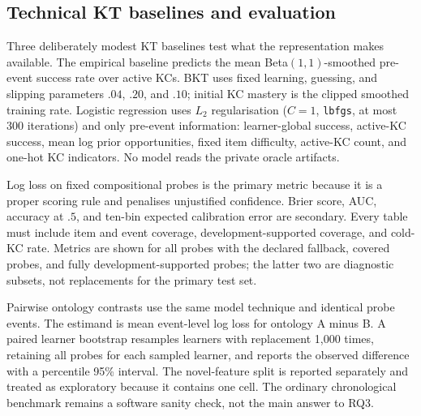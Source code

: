 \subsection{Technical KT baselines and evaluation}

Three deliberately modest KT baselines test what the representation makes
available.  The empirical baseline predicts the mean Beta$(1,1)$-smoothed
pre-event success rate over active KCs.  BKT uses fixed learning, guessing, and
slipping parameters $.04$, $.20$, and $.10$; initial KC mastery is the clipped
smoothed training rate.  Logistic regression uses $L_2$ regularisation
($C=1$, \texttt{lbfgs}, at most 300 iterations) and only pre-event information:
learner-global success, active-KC success, mean log prior opportunities, fixed
item difficulty, active-KC count, and one-hot KC indicators.  No model reads
the private oracle artifacts.

Log loss on fixed compositional probes is the primary metric because it is a
proper scoring rule and penalises unjustified confidence.  Brier score, AUC,
accuracy at $.5$, and ten-bin expected calibration error are secondary.
Every table must include item and event coverage, development-supported
coverage, and cold-KC rate.  Metrics are shown for all probes with the declared
fallback, covered probes, and fully development-supported probes; the latter
two are diagnostic subsets, not replacements for the primary test set.

Pairwise ontology contrasts use the same model technique and identical probe
events.  The estimand is mean event-level log loss for ontology A minus B.  A
paired learner bootstrap resamples learners with replacement 1,000 times,
retaining all probes for each sampled learner, and reports the observed
difference with a percentile 95\% interval.  The novel-feature split is
reported separately and treated as exploratory because it contains one cell.
The ordinary chronological benchmark remains a software sanity check, not the
main answer to RQ3.
